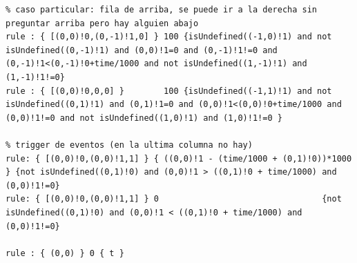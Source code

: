 \documentclass[10pt]{article}
\begin{document}
\begin{minipage}{1\textwidth}
	\centering
	\begin{lstlisting}
% caso particular: fila de arriba, se puede ir a la derecha sin preguntar arriba pero hay alguien abajo
rule : { [(0,0)!0,(0,-1)!1,0] } 100 {isUndefined((-1,0)!1) and not isUndefined((0,-1)!1) and (0,0)!1=0 and (0,-1)!1!=0 and (0,-1)!1<(0,-1)!0+time/1000 and not isUndefined((1,-1)!1) and (1,-1)!1!=0}
rule : { [(0,0)!0,0,0] }        100 {isUndefined((-1,1)!1) and not isUndefined((0,1)!1) and (0,1)!1=0 and (0,0)!1<(0,0)!0+time/1000 and (0,0)!1!=0 and not isUndefined((1,0)!1) and (1,0)!1!=0 }

% trigger de eventos (en la ultima columna no hay)
rule: { [(0,0)!0,(0,0)!1,1] } { ((0,0)!1 - (time/1000 + (0,1)!0))*1000 } {not isUndefined((0,1)!0) and (0,0)!1 > ((0,1)!0 + time/1000) and (0,0)!1!=0}
rule: { [(0,0)!0,(0,0)!1,1] } 0                                 {not isUndefined((0,1)!0) and (0,0)!1 < ((0,1)!0 + time/1000) and (0,0)!1!=0}

rule : { (0,0) } 0 { t }
	\end{lstlisting}
\end{minipage}
\end{document}
